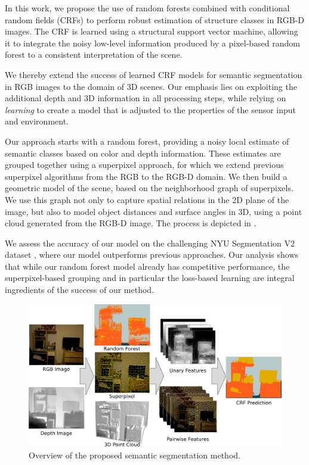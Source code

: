In this work, we propose the use of random forests combined with conditional
random fields (CRFs) to perform robust estimation of structure classes in RGB-D
images. The CRF is learned using a structural support vector machine,
allowing it to integrate the noisy low-level information produced by a pixel-based
random forest to a consistent interpretation of the scene.

We thereby extend the success of learned CRF models for
semantic segmentation in RGB images to the domain of 3D scenes.
Our emphasis lies on exploiting the additional depth and 3D information in all
processing steps, while relying on \emph{learning} to create a model that 
is adjusted to the properties of the sensor input and environment.

Our approach starts with a random forest, providing a noisy local estimate
of semantic classes based on color and depth information. These estimates
are grouped together using a superpixel approach, for which we extend previous
superpixel algorithms from the RGB to the RGB-D domain.
We then build a geometric model of the scene, based on the neighborhood graph
of superpixels.  We use this graph not only to capture spatial relations in the
2D plane of the image, but also to model object distances and surface angles in
3D, using a point cloud generated from the RGB-D image. The process is depicted
in .

We assess the accuracy of our model on the challenging NYU Segmentation V2
dataset \citep{SilbermanECCV12}, where our model outperforms previous
approaches.  Our analysis shows that while our random forest model
already has competitive performance, the superpixel-based grouping and in
particular the loss-based learning are integral ingredients of the success of our method.

\begin{figure}
    \begin{center}
        \includegraphics[width=\linewidth]{nyu/images/teaser}
    \end{center}
    \caption{%
        Overview of the proposed semantic segmentation method.\label{teaser}
    }
\end{figure}


